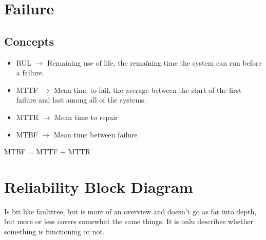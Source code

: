 \section{Failure}


\subsection{Concepts}
\begin{itemize}
	\item RUL $\rightarrow$ Remaining use of life, the remaining time the system can run before a failure.
	\item MTTF $\rightarrow$ Mean time to fail, the average between the start of the first failure and last among all of the systems.
	\item MTTR $\rightarrow$ Mean time to repair
	\item MTBF $\rightarrow$ Mean time between failure
\end{itemize}

MTBF = MTTF + MTTR
\\


\section{Reliability Block Diagram}
Is bit like faulttree, but is more of an overview and doesn't go as far into depth, but more or less covers somewhat the same things. It is onlu describes whether something is functioning or not.